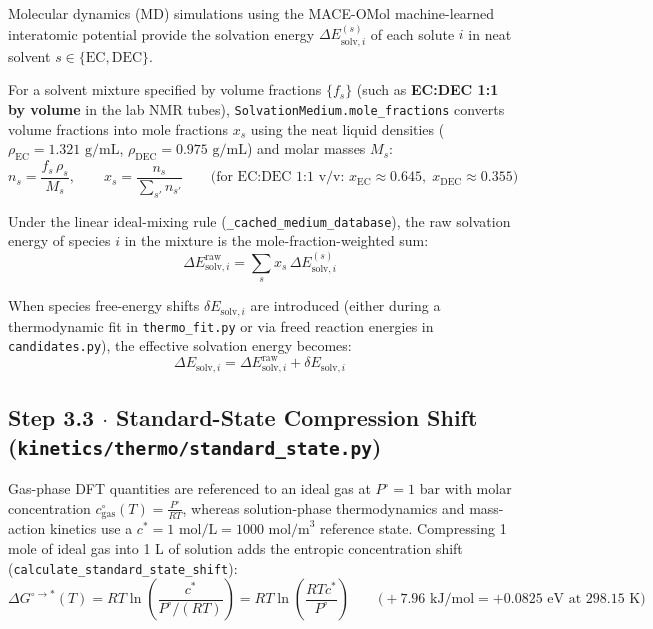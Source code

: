 \documentclass[11pt,a4paper]{article}
\begin{document}
Molecular dynamics (MD) simulations using the MACE-OMol machine-learned interatomic potential provide the solvation energy $\Delta E_{\text{solv}, i}^{(s)}$ of each solute $i$ in neat solvent $s \in \{\text{EC}, \text{DEC}\}$.

For a solvent mixture specified by volume fractions $\{f_s\}$ (such as \textbf{EC:DEC 1:1 by volume} in the lab NMR tubes), \texttt{SolvationMedium.mole\_\allowbreak{}fractions} converts volume fractions into mole fractions $x_s$ using the neat liquid densities ($\rho_{\text{EC}} = 1.321\text{ g/mL}$, $\rho_{\text{DEC}} = 0.975\text{ g/mL}$) and molar masses $M_s$:
\begin{equation}
n_s = \frac{f_s \, \rho_s}{M_s}, \qquad x_s = \frac{n_s}{\sum_{s'} n_{s'}} \qquad \big(\text{for EC:DEC 1:1 v/v: } x_{\text{EC}} \approx 0.645,\; x_{\text{DEC}} \approx 0.355\big)
\end{equation}

Under the linear ideal-mixing rule (\texttt{\_\allowbreak{}cached\_\allowbreak{}medium\_\allowbreak{}database}), the raw solvation energy of species $i$ in the mixture is the mole-fraction-weighted sum:
\begin{equation}
\Delta E_{\text{solv}, i}^{\text{raw}} = \sum_{s} x_s \, \Delta E_{\text{solv}, i}^{(s)}
\end{equation}

When species free-energy shifts $\delta E_{\text{solv}, i}$ are introduced (either during a thermodynamic fit in \texttt{thermo\_\allowbreak{}fit.py} or via freed reaction energies in \texttt{candidates.py}), the effective solvation energy becomes:
\begin{equation}
\Delta E_{\text{solv}, i} = \Delta E_{\text{solv}, i}^{\text{raw}} + \delta E_{\text{solv}, i}
\end{equation}

\subsection*{Step 3.3 $\cdot$ Standard-State Compression Shift (\texttt{kinetics/\allowbreak{}thermo/\allowbreak{}standard\_\allowbreak{}state.py})}

Gas-phase DFT quantities are referenced to an ideal gas at $P^\circ = 1\text{ bar}$ with molar concentration $c_{\text{gas}}^\circ(T) = \frac{P^\circ}{RT}$, whereas solution-phase thermodynamics and mass-action kinetics use a $c^* = 1\text{ mol/L} = 1000\text{ mol/m}^3$ reference state. Compressing 1 mole of ideal gas into 1 L of solution adds the entropic concentration shift (\texttt{calculate\_\allowbreak{}standard\_\allowbreak{}state\_\allowbreak{}shift}):
\begin{equation}
\Delta G^{\circ \to *}(T) = R T \ln\!\left(\frac{c^*}{P^\circ / (R T)}\right) = R T \ln\!\left(\frac{R T c^*}{P^\circ}\right) \qquad \big(+7.96\text{ kJ/mol} = +0.0825\text{ eV at } 298.15\text{ K}\big)
\end{equation}
\end{document}
